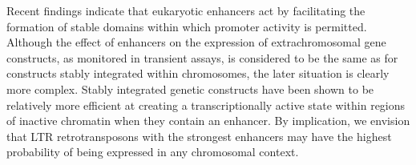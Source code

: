 Recent findings indicate that eukaryotic enhancers act by facilitating the formation of stable domains within which promoter activity is permitted. Although the effect of enhancers on the expression of extrachromosomal gene constructs, as monitored in transient assays, is considered to be the same as for constructs stably integrated within chromosomes, the later situation is clearly more complex. Stably integrated genetic constructs have been shown to be relatively more efficient at creating a transcriptionally active state within regions of inactive chromatin when they contain an enhancer. By implication, we envision that LTR retrotransposons with the strongest enhancers may have the highest probability of being expressed in any chromosomal context.


